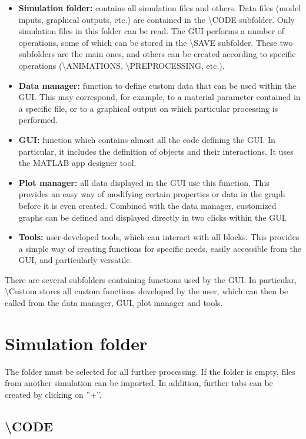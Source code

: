 \documentclass{article}
\begin{document}
\begin{itemize}
    \item \textbf{Simulation folder:} contains all simulation files and others. Data files (model inputs, graphical outputs, etc.) are contained in the \textbackslash CODE subfolder. Only simulation files in this folder can be read. The GUI performs a number of operations, some of which can be stored in the \textbackslash SAVE subfolder. These two subfolders are the main ones, and others can be created according to specific operations (\textbackslash ANIMATIONS, \textbackslash PREPROCESSING, etc.).
    \item \textbf{Data manager:} function to define custom data that can be used within the GUI. This may correspond, for example, to a material parameter contained in a specific file, or to a graphical output on which particular processing is performed.
    \item \textbf{GUI:} function which contains almost all the code defining the GUI. In particular, it includes the definition of objects and their interactions. It uses the MATLAB app designer tool.
    \item \textbf{Plot manager:} all data displayed in the GUI use this function. This provides an easy way of modifying certain properties or data in the graph before it is even created. Combined with the data manager, customized graphs can be defined and displayed directly in two clicks within the GUI.
    \item \textbf{Tools:} user-developed tools, which can interact with all blocks. This provides a simple way of creating functions for specific needs, easily accessible from the GUI, and particularly versatile.
\end{itemize}

There are several subfolders containing functions used by the GUI. In particular, \textbackslash Custom stores all custom functions developed by the user, which can then be called from the data manager, GUI, plot manager and tools.

\section{Simulation folder}

The folder must be selected for all further processing. If the folder is empty, files from another simulation can be imported. In addition, further tabs can be created by clicking on ''+''.

\subsection{\textbackslash CODE}
\end{document}
